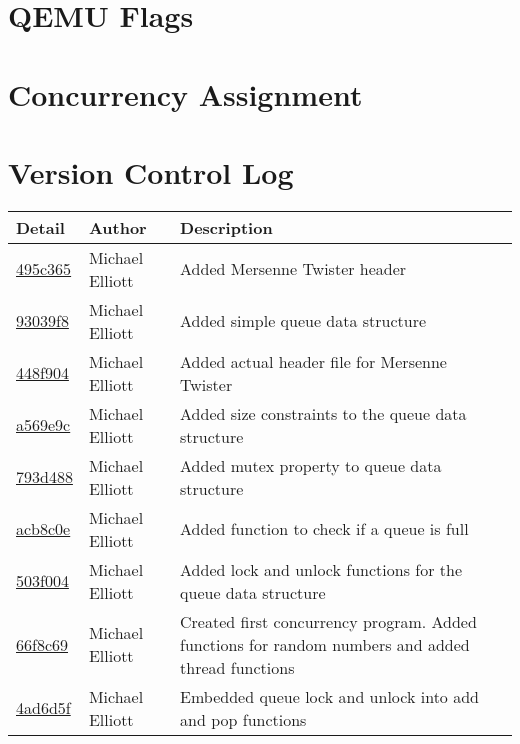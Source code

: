 \documentclass[letterpaper,10pt,titlepage,draftclsnofoot,onecolumn]{IEEEtran}
\begin{document}
\section{QEMU Flags}


\section{Concurrency Assignment}


\section{Version Control Log}
\begin{tabular}{l l l}\textbf{Detail} & \textbf{Author} & \textbf{Description}\\\hline
\href{https://github.com/elliomic/CS-444/commit/495c3654bd7736ea43c6a88eb59743eab5e64695}{495c365} & Michael Elliott & Added Mersenne Twister header\\\hline
\href{https://github.com/elliomic/CS-444/commit/93039f88419ac754dcbd9f5e86c4acc2ae075c92}{93039f8} & Michael Elliott & Added simple queue data structure\\\hline
\href{https://github.com/elliomic/CS-444/commit/448f904d4299eed4f7290557a7dd2ed03a731583}{448f904} & Michael Elliott & Added actual header file for Mersenne Twister\\\hline
\href{https://github.com/elliomic/CS-444/commit/a569e9c76e5f3b7d77a61959641102f75df9826e}{a569e9c} & Michael Elliott & Added size constraints to the queue data structure\\\hline
\href{https://github.com/elliomic/CS-444/commit/793d488cb52123a48e8d345293ce4359e2c301c1}{793d488} & Michael Elliott & Added mutex property to queue data structure\\\hline
\href{https://github.com/elliomic/CS-444/commit/acb8c0e69e610e33efc6d0764caa3ccc66a663d9}{acb8c0e} & Michael Elliott & Added function to check if a queue is full\\\hline
\href{https://github.com/elliomic/CS-444/commit/503f004502547d608cf63b7cd5b60aad8b3ab3f7}{503f004} & Michael Elliott & Added lock and unlock functions for the queue data structure\\\hline
\href{https://github.com/elliomic/CS-444/commit/66f8c69f4b2b4122718aad4f72a9eeadd9e06545}{66f8c69} & Michael Elliott & Created first concurrency program. Added functions for random numbers and added thread functions\\\hline
\href{https://github.com/elliomic/CS-444/commit/4ad6d5f2f7a954616d7a38cb8cecd9c26fc3c5f3}{4ad6d5f} & Michael Elliott & Embedded queue lock and unlock into add and pop functions\\\hline

\end{tabular}
\end{document}
